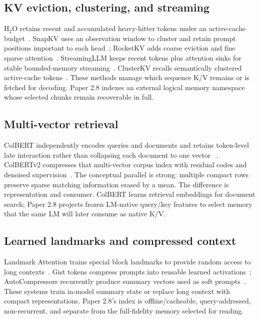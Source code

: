 \documentclass[11pt]{article}
\newcommand{\kv}{\textsc{K/V}\xspace}
\begin{document}
\subsection{KV eviction, clustering, and streaming}
H$_2$O retains recent and accumulated heavy-hitter tokens under an active-cache
budget~\cite{zhang2023h2o}. SnapKV uses an observation window to cluster and
retain prompt positions important to each head~\cite{li2024snapkv}; RocketKV
adds coarse eviction and fine sparse attention~\cite{behnam2025rocketkv}.
StreamingLLM keeps recent tokens plus attention sinks for stable bounded-memory
streaming~\cite{xiao2024streaming}. ClusterKV recalls semantically clustered
active-cache tokens~\cite{liu2024clusterkv}. These methods manage which sequence
\kv remains or is fetched for decoding. Paper 2.8 indexes an external logical
memory namespace whose selected chunks remain recoverable in full.

\subsection{Multi-vector retrieval}
ColBERT independently encodes queries and documents and retains token-level
late interaction rather than collapsing each document to one vector
~\cite{khattab2020colbert}. ColBERTv2 compresses that multi-vector corpus index
with residual codes and denoised supervision~\cite{santhanam2022colbertv2}.
The conceptual parallel is strong: multiple compact rows preserve sparse
matching information erased by a mean. The difference is representation and
consumer. ColBERT learns retrieval embeddings for document search; Paper 2.8
projects frozen LM-native query/key features to select memory that the same LM
will later consume as native \kv.

\subsection{Learned landmarks and compressed context}
Landmark Attention trains special block landmarks to provide random access to
long contexts~\cite{mohtashami2023landmark}. Gist tokens compress prompts into
reusable learned activations~\cite{mu2023gist}; AutoCompressors recurrently
produce summary vectors used as soft prompts~\cite{chevalier2023autocompressors}.
These systems train in-model summary state or replace long context with compact
representations. Paper 2.8's index is offline/cacheable, query-addressed,
non-recurrent, and separate from the full-fidelity memory selected for reading.
\end{document}
